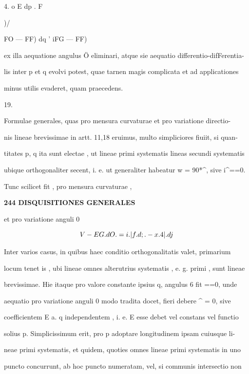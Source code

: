 \documentclass[12pt,a4paper]{article}
\begin{document}
{{{{{4.    o  E  dp    .  F

)/{FO  —  FF)    dq    '    \/iFG  —  FF)

ex  illa  aequatione  angulus  Ö  eliminari,  atque  sie  aequatio  differentio-difFerentia-

lis  inter  p  et  q  evolvi  potest,  quae  tarnen  magis  complicata  et  ad  applicationes

minus  utilis  evaderet,  quam  praecedens.

19.

Formulae  generales,  quas  pro  mensura  curvaturae  et  pro  variatione  directio-

nis  lineae  brevissimae  in  artt.  11,18  eruimus,  multo  simpliciores  fiuiit,  si  quan-

titates  p,  q  ita  sunt  electae ,  ut  lineae  primi  systematis  lineas  secundi  systematis

ubique  orthogonaliter  secent,  i.  e.  ut  generaliter  habeatur  w  =  90*^,  sive  i^==0.

Tunc  scilicet  fit ,  pro  mensura  curvaturae ,

\newpage
\setcounter{page}{244}

\noindent\textbf{244  DISQUISITIONES  GENERALES}\par

et  pro  variatione  anguli  0

\[
V-EG.dO.=  i.|f.d;.-x.4|.dj \\
\]

Inter  varios  casus,  in  quibus  haec  conditio  orthogonalitatis  valet,  primarium

locum  tenet  is ,  ubi  lineae  omnes  alterutrius  systematis ,  e.  g.  primi ,  sunt  lineae

brevissimae.  Hie  itaque  pro  valore  constante  ipsius  q,  angulus  6  fit  ==0,  unde

aequatio  pro  variatione  anguli  0  modo  tradita  docet,  fieri  debere  ^  =  0,  sive

coefficientem  E  a.  q  independentem ,  i.  e.  E  esse  debet  vel  constans  vel  functio

solius  p.  Simplicissimum  erit,  pro  p  adoptare  longitudinem  ipsam  cuiusque  li-

neae primi  systematis,  et  quidem,  quoties  omnes  lineae  primi  systematis  in  uno

puncto  concurrunt,  ab  hoc  puncto  numeratam,  vel,  si  communis  intersectio  non

}}}}}}
\end{document}
